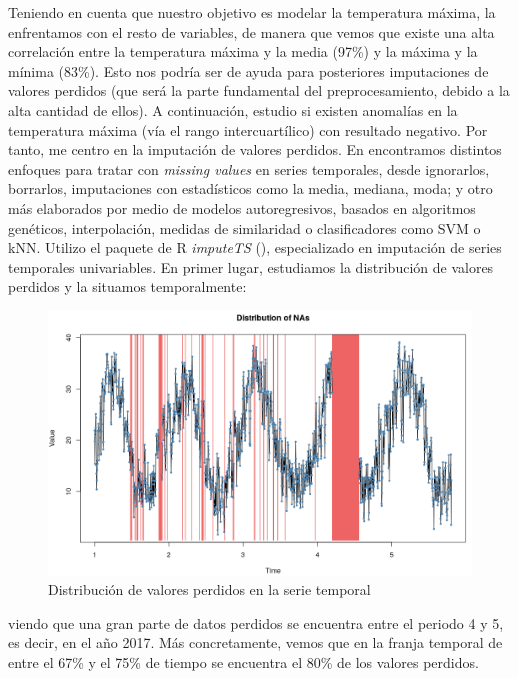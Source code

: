 Teniendo en cuenta que nuestro objetivo es modelar la temperatura máxima, la enfrentamos con el resto de variables, de manera que vemos que existe una alta correlación entre la temperatura máxima y la media (97\%) y la máxima y la mínima (83\%). Esto nos podría ser de ayuda para posteriores imputaciones de valores perdidos (que será la parte fundamental del preprocesamiento, debido a la alta cantidad de ellos). A continuación, estudio si existen anomalías en la temperatura máxima (vía el rango intercuartílico) con resultado negativo. Por tanto, me centro en la imputación de valores perdidos. En \cite{na1} encontramos distintos enfoques para tratar con \textit{missing values} en series temporales, desde ignorarlos, borrarlos, imputaciones con estadísticos como la media, mediana, moda; y otro más elaborados por medio de modelos autoregresivos, basados en algoritmos genéticos, interpolación, medidas de similaridad o clasificadores como SVM o kNN. Utilizo el paquete de R \textit{imputeTS} (\cite{RJ-2017-009}), especializado en imputación de series temporales univariables. En primer lugar, estudiamos la distribución de valores perdidos y la situamos temporalmente:

\begin{figure}[H] %
	\centering
	\includegraphics[scale=0.42]{na-dist.png}  %
	\caption{Distribución de valores perdidos en la serie temporal} 
	\label{fig:na-dist}
\end{figure}

viendo que una gran parte de datos perdidos se encuentra entre el periodo 4 y 5, es decir, en el año 2017. Más concretamente, vemos que en la franja temporal de entre el 67\% y el 75\% de tiempo se encuentra el 80\% de los valores perdidos.

